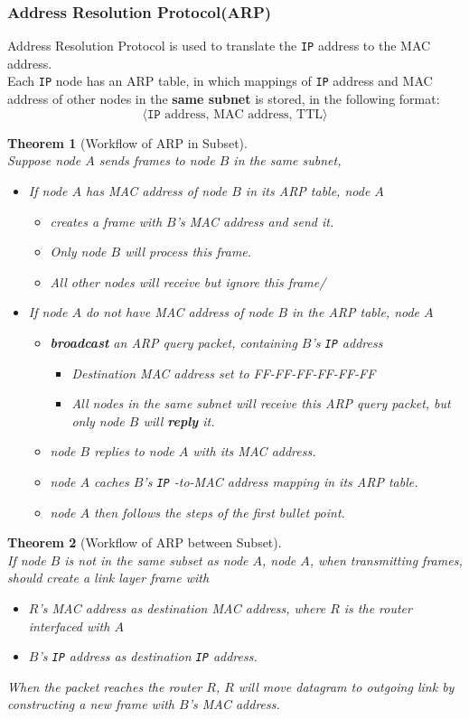 \documentclass[12pt]{article}
\newcommand\IP{\texttt{IP} }
\newtheorem{theorem}{Theorem}[section]
\theoremstyle{definition}
\begin{document}
\subsubsection{Address Resolution Protocol(ARP)}
Address Resolution Protocol is used to translate the \IP address to the MAC address.\\Each \IP node has an ARP table, in which mappings of \IP address and MAC address of other nodes in the \textbf{same subnet} is stored, in the following format:
\[
\langle\IP \text{ address, MAC address, TTL}\rangle
\]
\begin{theorem}[Workflow of ARP in Subset]
\hfill\\\normalfont Suppose node $A$ sends frames to node $B$ in the same subnet,
\begin{itemize}
  \item If node $A$ has MAC address of node $B$ in its ARP table, node $A$
  \begin{itemize}
    \item creates a frame with $B$'s MAC address and send it.
    \item Only node $B$ will process this frame.
    \item All other nodes will receive but ignore this frame/
  \end{itemize} 
  \item If node $A$ do not have MAC address of node $B$ in the ARP table, node $A$
  \begin{itemize}
    \item \textbf{broadcast} an ARP query packet, containing $B$'s \IP address
    \begin{itemize}
      \item Destination MAC address set to FF-FF-FF-FF-FF-FF
      \item All nodes in the same subnet will receive this ARP query packet, but only node $B$ will \textbf{reply} it.
    \end{itemize}
    \item node $B$ replies to node $A$ with its MAC address.
    \item node $A$ caches $B$'s \IP-to-MAC address mapping in its ARP table.
    \item node $A$ then follows the steps of the first bullet point.
  \end{itemize}
\end{itemize}
\end{theorem}
\begin{theorem}[Workflow of ARP between Subset]
\hfill\\\normalfont If node $B$ is not in the same subset as node $A$, node $A$, when transmitting frames, should create a link layer frame with
\begin{itemize}
  \item $R$'s MAC address as destination MAC address, where $R$ is the router interfaced with $A$
  \item $B$'s \IP address as destination \IP address.
\end{itemize}
When the packet reaches the router $R$, $R$ will move datagram to outgoing link by constructing a new frame with $B$'s MAC address.
\end{theorem}
\end{document}
